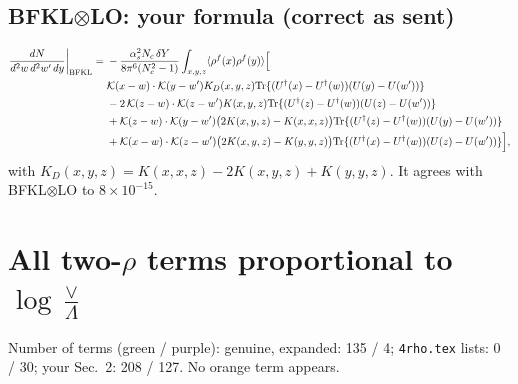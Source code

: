 \documentclass[10pt]{article}
\numberwithin{equation}{section}
\begin{document}
\subsection{BFKL$\otimes$LO: your formula (correct as sent)}
\begin{align}
\frac{dN}{d^2w\,d^2w'\,dy}\bigg|_{\rm BFKL}={}&-\frac{\alpha_s^2N_c\,\delta Y}{8\pi^6(N_c^2-1)}\int_{x,y,z}\langle\rho^f(x)\rho^f(y)\rangle\Big[\notag\\
&\mathcal K(x-w)\cdot\mathcal K(y-w')K_D(x,y,z){\rm Tr}\{(U^\dagger(x)-U^\dagger(w))(U(y)-U(w'))\}\notag\\
&-2\,\mathcal K(z-w)\cdot\mathcal K(z-w')K(x,y,z){\rm Tr}\{(U^\dagger(z)-U^\dagger(w))(U(z)-U(w'))\}\notag\\
&+\mathcal K(z-w)\cdot\mathcal K(y-w')\big(2K(x,y,z)-K(x,x,z)\big){\rm Tr}\{(U^\dagger(z)-U^\dagger(w))(U(y)-U(w'))\}\notag\\
&+\mathcal K(x-w)\cdot\mathcal K(z-w')\big(2K(x,y,z)-K(y,y,z)\big){\rm Tr}\{(U^\dagger(x)-U^\dagger(w))(U(z)-U(w'))\}\Big],
\label{eq:BFKL}
\end{align}
with $K_D(x,y,z)=K(x,x,z)-2K(x,y,z)+K(y,y,z)$. It agrees with BFKL$\otimes$LO to $8\times10^{-15}$.

\section{All two-$\rho$ terms proportional to $\log\frac{\vee}{\Lambda}$}\label{sec:two}
Number of terms (green / purple): genuine, expanded: 135 / 4; \texttt{4rho.tex} lists: 0 / 30; your Sec.~2: 208 / 127. No orange term appears.
\end{document}
